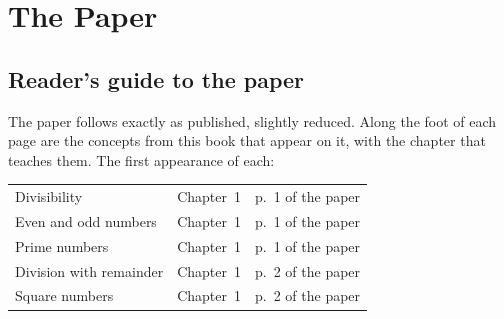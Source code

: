 \part{The Paper}
\chapter*{Reader's guide to the paper}
The paper follows exactly as published, slightly reduced. Along the foot of each page are the concepts from this book that appear on it, with the chapter that teaches them. The first appearance of each:

\begin{longtable}{p{}ll}
Divisibility & Chapter~1 & p.~1 of the paper\\
Even and odd numbers & Chapter~1 & p.~1 of the paper\\
Prime numbers & Chapter~1 & p.~1 of the paper\\
Division with remainder & Chapter~1 & p.~2 of the paper\\
Square numbers & Chapter~1 & p.~2 of the paper\\
\end{longtable}






